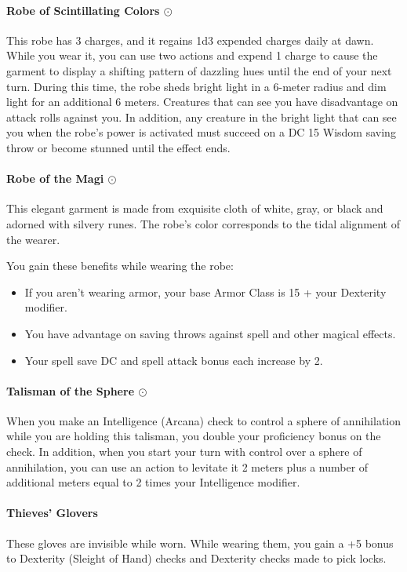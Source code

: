     \paragraph{Robe of Scintillating Colors $\odot$}
        This robe has 3 charges, and it regains 1d3 expended charges daily at dawn.
        While you wear it, you can use two actions and expend 1 charge to cause the garment to display a shifting pattern of dazzling hues until the end of your next turn.
        During this time, the robe sheds bright light in a 6-meter radius and dim light for an additional 6 meters.
        Creatures that can see you have disadvantage on attack rolls against you.
        In addition, any creature in the bright light that can see you when the robe's power is activated must succeed on a DC 15 Wisdom saving throw or become stunned until the effect ends.
    \paragraph{Robe of the Magi $\odot$}
        This elegant garment is made from exquisite cloth of white, gray, or black and adorned with silvery runes.
        The robe's color corresponds to the tidal alignment of the wearer.

        You gain these benefits while wearing the robe:
        \begin{itemize}
            \item If you aren't wearing armor, your base Armor Class is 15 + your Dexterity modifier.
            \item You have advantage on saving throws against spell and other magical effects.
            \item Your spell save DC and spell attack bonus each increase by 2.
        \end{itemize}
    \paragraph{Talisman of the Sphere $\odot$}
        When you make an Intelligence (Arcana) check to control a sphere of annihilation while you are holding this talisman, you double your proficiency bonus on the check.
        In addition, when you start your turn with control over a sphere of annihilation, you can use an action to levitate it 2 meters plus a number of additional meters equal to 2 times your Intelligence modifier.
    \paragraph{Thieves' Glovers}
        These gloves are invisible while worn.
        While wearing them, you gain a +5 bonus to Dexterity (Sleight of Hand) checks and Dexterity checks made to pick locks.
